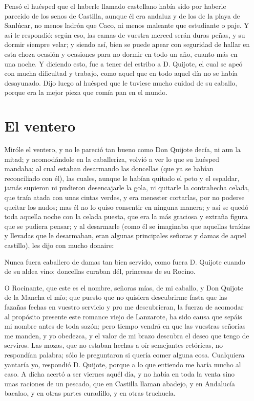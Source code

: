    Pensó el huésped que el haberle llamado castellano había sido por
    haberle parecido de los senos de Castilla, aunque él era andaluz y
    de los de la playa de Sanlúcar, no menos ladrón que Caco, ni menos
    maleante que estudiante o paje. Y así le respondió: según eso, las
    camas de vuestra merced serán duras peñas, y su dormir siempre
    velar; y siendo así, bien se puede apear con seguridad de hallar
    en esta choza ocasión y ocasiones para no dormir en todo un año,
    cuanto más en una noche. Y diciendo esto, fue a tener del estribo
    a D. Quijote, el cual se apeó con mucha dificultad y trabajo, como
    aquel que en todo aquel día no se había desayunado. Dijo luego al
    huésped que le tuviese mucho cuidad de su caballo, porque era la
    mejor pieza que comía pan en el mundo.

\section{El ventero}

    Miróle el ventero, y no le pareció tan bueno como Don Quijote
    decía, ni aun la mitad; y acomodándole en la caballeriza, volvió a
    ver lo que su huésped mandaba; al cual estaban desarmando las
    doncellas (que ya se habían reconciliado con él), las cuales,
    aunque le habían quitado el peto y el espaldar, jamás supieron ni
    pudieron desencajarle la gola, ni quitarle la contrahecha celada,
    que traía atada con unas cintas verdes, y era menester cortarlas,
    por no poderse queitar los nudos; mas él no lo quiso consentir en
    ninguna manera; y así se quedó toda aquella noche con la celada
    puesta, que era la más graciosa y extraña figura que se pudiera
    pensar; y al desarmarle (como él se imaginaba que aquellas traídas
    y llevadas que le desarmaban, eran algunas principales señoras y
    damas de aquel castillo), les dijo con mucho donaire:
    
    Nunca fuera caballero de damas tan bien servido, como fuera D.
    Quijote cuando de su aldea vino; doncellas curaban dél, princesas
    de su Rocino.
    
    O Rocinante, que este es el nombre, señoras mías, de mi caballo, y
    Don Quijote de la Mancha el mío; que puesto que no quisiera
    descubrirme fasta que las fazañas fechas en vuestro servicio y pro
    me descubrieran, la fuerza de acomodar al propósito presente este
    romance viejo de Lanzarote, ha sido causa que sepáis mi nombre
    antes de toda sazón; pero tiempo vendrá en que las vuestras
    señorías me manden, y yo obedezca, y el valor de mi brazo descubra
    el deseo que tengo de serviros. Las mozas, que no estaban hechas a
    oír semejantes retóricas, no respondían palabra; sólo le
    preguntaron si quería comer alguna cosa. Cualquiera yantaría yo,
    respondió D. Quijote, porque a lo que entiendo me haría mucho al
    caso. A dicha acertó a ser viernes aquél día, y no había en toda
    la venta sino unas raciones de un pescado, que en Castilla llaman
    abadejo, y en Andalucía bacalao, y en otras partes curadillo, y en
    otras truchuela.
    
